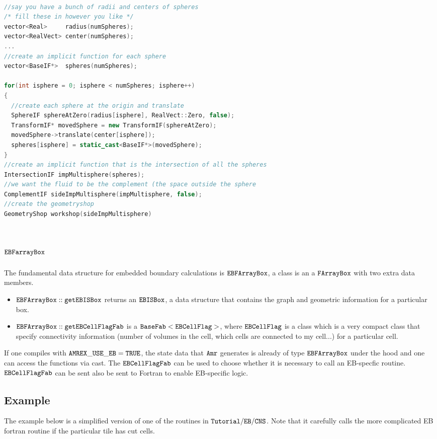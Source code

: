 \begin{lstlisting}[language=cpp]

//say you have a bunch of radii and centers of spheres
/* fill these in however you like */
vector<Real>     radius(numSpheres);
vector<RealVect> center(numSpheres);
...
//create an implicit function for each sphere
vector<BaseIF*>  spheres(numSpheres);

for(int isphere = 0; isphere < numSpheres; isphere++)
{
  //create each sphere at the origin and translate
  SphereIF sphereAtZero(radius[isphere], RealVect::Zero, false);
  TransformIF* movedSphere = new TransformIF(sphereAtZero);
  movedSphere->translate(center[isphere]);
  spheres[isphere] = static_cast<BaseIF*>(movedSphere);
}
//create an implicit function that is the intersection of all the spheres
IntersectionIF impMultisphere(spheres);
//we want the fluid to be the complement (the space outside the sphere
ComplementIF sideImpMultisphere(impMultisphere, false);
//create the geometryshop
GeometryShop workshop(sideImpMultisphere)
\end{lstlisting}


\section{$\tt{EBFarrayBox}$}

The fundamental data structure for embedded boundary calculations is 
$\tt{EBFArrayBox}$, a class is an a $\tt{FArrayBox}$ with two extra
data members.
\begin{itemize}
\item $\tt{EBFArrayBox::getEBISBox}$ returns an $\tt{EBISBox}$, a data
  structure that contains the graph and geometric information for a
  particular box.
\item $\tt{EBFArrayBox::getEBCellFlagFab}$  is a
  $\tt{BaseFab<EBCellFlag>}$, where $\tt{EBCellFlag}$ is a class which
  is a very compact class that specify connectivity information
  (number of volumes in the cell, which cells are connected to my
  cell...) for a particular cell.
\end{itemize}
If one compiles with $\tt{AMREX\_USE\_EB = TRUE}$, the state data that
${\tt Amr}$ generates is already of type $\tt{EBFArrayBox}$ under the
hood and one can access the functions via cast.   The
$\tt{EBCellFlagFab}$ can be used to choose whether it is necessary to call an
EB-specfic routine. $\tt{EBCellFlagFab}$  can be sent also be sent to Fortran to 
enable EB-specific logic.   

\subsection{Example}
The example below is a simplified version
of one of the routines in $\tt{Tutorial/EB/CNS}$.   Note  that  it
carefully calls the more complicated EB fortran routine if the
particular tile has cut cells.


